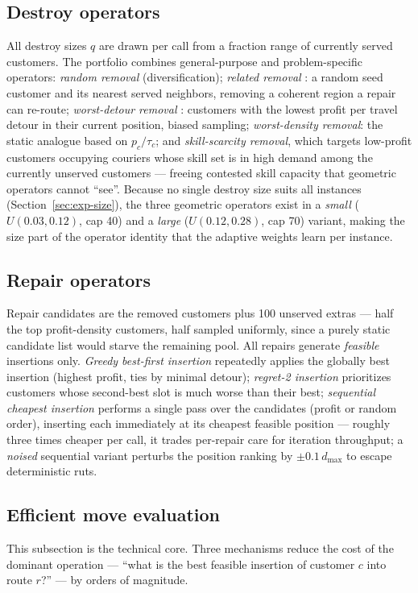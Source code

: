 \documentclass[10pt, a4paper]{article}
\begin{document}
\subsection{Destroy operators}
All destroy sizes $q$ are drawn per call from a fraction range of currently
served customers. The portfolio combines general-purpose and
problem-specific operators:
\emph{random removal} (diversification);
\emph{related removal} \cite{shaw1998}: a random seed customer and its
nearest served neighbors, removing a coherent region a repair can re-route;
\emph{worst-detour removal} \cite{ropke2006}: customers with the lowest
profit per travel detour in their current position, biased sampling;
\emph{worst-density removal}: the static analogue based on $p_c/\tau_c$;
and \emph{skill-scarcity removal}, which targets low-profit customers
occupying couriers whose skill set is in high demand among the currently
unserved customers --- freeing contested skill capacity that geometric
operators cannot ``see''.
Because no single destroy size suits all instances
(Section~\ref{sec:exp-size}), the three geometric operators exist in a
\emph{small} ($U(0.03,0.12)$, cap 40) and a \emph{large} ($U(0.12,0.28)$, cap
70) variant, making the size part of the operator identity that the adaptive
weights learn per instance.

\subsection{Repair operators}
Repair candidates are the removed customers plus 100 unserved extras --- half
the top profit-density customers, half sampled uniformly, since a purely
static candidate list would starve the remaining pool. All repairs generate
\emph{feasible} insertions only.
\emph{Greedy best-first insertion} repeatedly applies the globally best
insertion (highest profit, ties by minimal detour);
\emph{regret-2 insertion} \cite{ropke2006} prioritizes customers whose
second-best slot is much worse than their best;
\emph{sequential cheapest insertion} \cite{kovacs2012} performs a single pass
over the candidates (profit or random order), inserting each immediately at
its cheapest feasible position --- roughly three times cheaper per call, it
trades per-repair care for iteration throughput;
a \emph{noised} sequential variant perturbs the position ranking by
$\pm 0.1\,d_{\max}$ \cite{ropke2006} to escape deterministic ruts.

\subsection{Efficient move evaluation}\label{sec:eval}
This subsection is the technical core. Three mechanisms reduce the cost of
the dominant operation --- ``what is the best feasible insertion of customer
$c$ into route $r$?'' --- by orders of magnitude.
\end{document}
